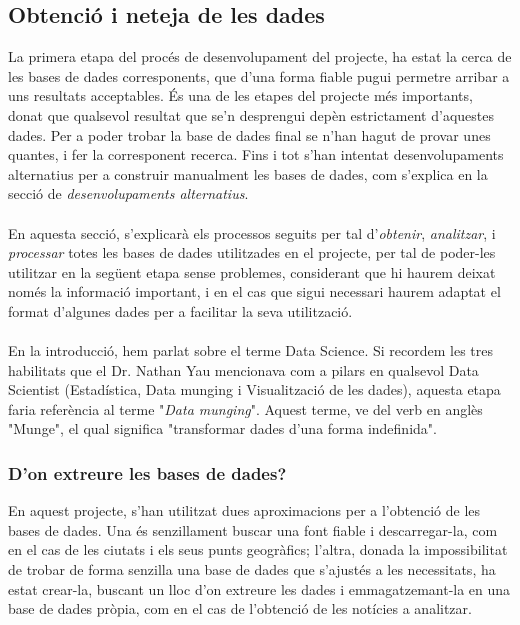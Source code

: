 \documentclass[12pt,a4paper,openright,oneside]{article}
\numberwithin{equation}{section}
\theoremstyle{definition}
\begin{document}
\subsection{Obtenció i neteja de les dades}
La primera etapa del procés de desenvolupament del projecte, ha estat la cerca de les bases de dades corresponents, que d'una forma fiable pugui permetre arribar a uns resultats acceptables. És una de les etapes del projecte més importants, donat que qualsevol resultat que se'n desprengui depèn estrictament d'aquestes dades. Per a poder trobar la base de dades final se n'han hagut de provar unes quantes, i fer la corresponent recerca. Fins i tot s'han intentat desenvolupaments alternatius per a construir manualment les bases de dades, com s'explica en la secció de \textit{desenvolupaments alternatius}.\\ \\
En aquesta secció, s'explicarà els processos seguits per tal d'\emph{obtenir}, \emph{analitzar}, i \emph{processar} totes les bases de dades utilitzades en el projecte, per tal de poder-les utilitzar en la següent etapa sense problemes, considerant que hi haurem deixat només la informació important, i en el cas que sigui necessari haurem adaptat el format d'algunes dades per a facilitar la seva utilització.\\ \\
En la introducció, hem parlat sobre el terme Data Science. Si recordem les tres habilitats que el Dr. Nathan Yau mencionava com a pilars en qualsevol Data Scientist (Estadística, Data munging i Visualització de les dades), aquesta etapa faria referència al terme "\emph{Data munging}". Aquest terme, ve del verb en anglès "Munge", el qual significa "transformar dades d'una forma indefinida".
\subsubsection*{D'on extreure les bases de dades?}
En aquest projecte, s'han utilitzat dues aproximacions per a l'obtenció de les bases de dades. Una és senzillament buscar una font fiable i descarregar-la, com en el cas de les ciutats i els seus punts geogràfics; l'altra, donada la impossibilitat de trobar de forma senzilla una base de dades que s'ajustés a les necessitats, ha estat crear-la, buscant un lloc d'on extreure les dades i emmagatzemant-la en una base de dades pròpia, com en el cas de l'obtenció de les notícies a analitzar.
\end{document}
